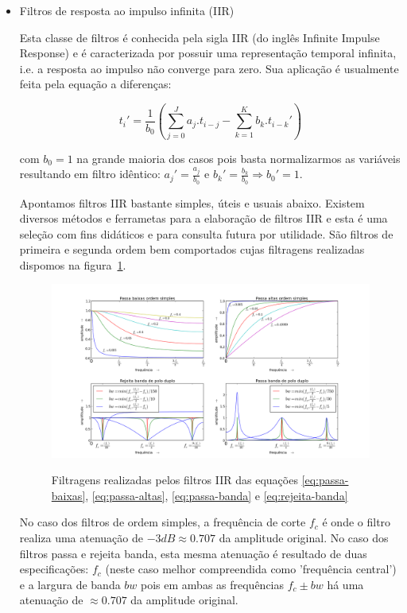 \begin{itemize}
\item Filtros de resposta ao impulso infinita (IIR)

Esta classe de filtros é
conhecida pela sigla IIR (do inglês Infinite Impulse Response)
e é caracterizada por possuir uma representação temporal
infinita, i.e. a resposta ao impulso não converge para zero. Sua aplicação é usualmente feita pela equação
a diferenças:

\begin{equation}
t_i' = \frac{1}{b_0}\left ( \sum_{j=0}^Ja_j . t_{i-j} - \sum_{k=1}^Kb_k . t_{i-k}' \right )
\end{equation}

com $b_0=1$ na grande maioria dos casos pois basta normalizarmos as variáveis
resultando em filtro idêntico: $a_j'=\frac{a_j}{b_0}$ e $b_k'=\frac{b_k}{b_0} \Rightarrow b_0' = 1$.

Apontamos filtros IIR bastante simples, úteis e usuais abaixo. Existem
diversos métodos e ferrametas para a elaboração de filtros IIR
e esta é uma seleção com fins didáticos e para consulta futura por
utilidade.
São filtros de primeira e segunda ordem bem comportados cujas
filtragens realizadas dispomos na figura~\ref{fig:iir}.

\begin{figure}[h!]
    \centering
    \caption{Filtragens realizadas pelos filtros IIR das equações \ref{eq:passa-baixas}, \ref{eq:passa-altas}, \ref{eq:passa-banda} e \ref{eq:rejeita-banda}}
        \includegraphics[width=\textwidth]{figuras/iir___}
        \label{fig:iir}
\end{figure}

No caso dos filtros de ordem simples, a frequência de corte $f_c$ é onde 
o filtro realiza uma atenuação de $-3dB \approx 0.707 $ da amplitude original.
No caso dos filtros passa e rejeita banda, esta mesma atenuação é
resultado de duas especificações: $f_c$ (neste caso melhor compreendida como 'frequência central') e a largura de banda $bw$
pois em ambas as frequências $f_c \pm bw$ há uma atenuação de $\approx 0.707$ da amplitude original.


\end{itemize}
